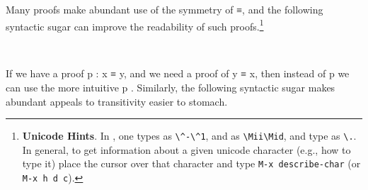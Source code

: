 Many proofs make abundant use of the symmetry of \ad ≡, and the following syntactic sugar can improve the readability of such proofs.\footnote{%
\textbf{Unicode Hints}. In \agdamode, one types  as \texttt{\textbackslash{}\^{}-\textbackslash{}\^{}1}, and  as \texttt{\textbackslash{}Mii\textbackslash{}Mid}, and type  as \texttt{\textbackslash{}.}. In general, to get information about a given unicode character (e.g., how to type it) place the cursor over that character and type \texttt{M-x\ describe-char} (or \texttt{M-x\ h\ d\ c}).}
\ccpad
\begin{code}
\>[1]\AgdaSpace{}%
\AgdaSymbol{:}\AgdaSpace{}%
\AgdaSymbol{\{}\AgdaSpace{}%
\AgdaSymbol{:}\AgdaSpace{}%
\AgdaSpace{}%
\AgdaSpace{}%
\AgdaSymbol{\}}\AgdaSpace{}%
\AgdaSpace{}%
\AgdaSymbol{\{}\AgdaSpace{}%
\AgdaSpace{}%
\AgdaSymbol{:}\AgdaSpace{}%
\AgdaSymbol{\}}\AgdaSpace{}%
\AgdaSpace{}%
\AgdaSpace{}%
\AgdaSpace{}%
\AgdaSpace{}%
\AgdaSpace{}%
\AgdaSpace{}%
\AgdaSpace{}%
\<%
\\
%
\>[1]\AgdaSpace{}%
\AgdaSpace{}%
\AgdaSymbol{=}\AgdaSpace{}%
\AgdaSpace{}%
\<%
\end{code}
\ccpad
If we have a proof \ab p \as : \ab x \aod ≡ \ab y, and we need a proof of \ab y \aod ≡ \ab x, then instead of  \ab p we can use the more intuitive \ab p . Similarly, the following syntactic sugar makes abundant appeals to transitivity easier to stomach.
\ccpad
